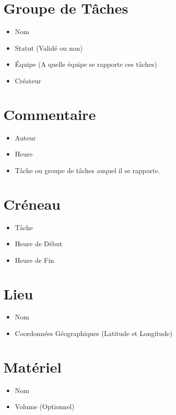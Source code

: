 \section{Groupe de Tâches}
\begin{itemize}
 \item Nom
\item Statut (Validé ou non)
\item Équipe (A quelle équipe se rapporte ces tâches)
\item Créateur

\end{itemize}

\section{Commentaire}
\begin{itemize}
 \item Auteur
\item Heure
\item Tâche ou groupe de tâches auquel il se rapporte.

\end{itemize}


\section{Créneau}
\begin{itemize}
 \item Tâche
\item Heure de Début
\item Heure de Fin

\end{itemize}

\section{Lieu}
\begin{itemize}
\item Nom
\item Coordonnées Géographiques (Latitude et Longitude)
\end{itemize}



\section{Matériel}
\begin{itemize}
\item Nom
\item Volume (Optionnel)

\end{itemize}


